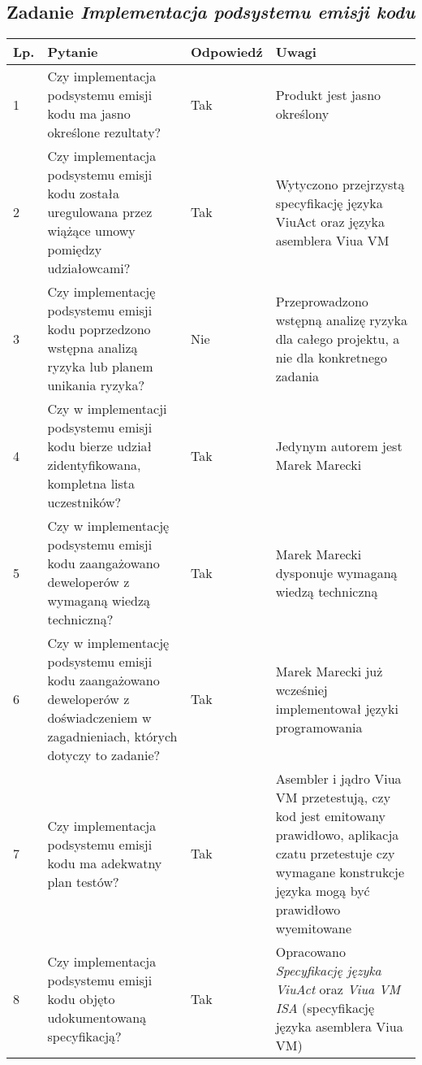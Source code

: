 \documentclass[11pt,oneside,a4paper,titlepage,onecolumn]{article}
\begin{document}
\subsection{Zadanie \textit{Implementacja podsystemu emisji kodu}}

\phantom{...}

\begin{tabularx}{\textwidth}{|l|X|l|X|}
	\hline

	\hline
    Lp. & Pytanie & Odpowiedź & Uwagi \\ \hline
    
    1 
    & Czy implementacja podsystemu emisji kodu ma jasno określone 
    rezultaty?
    & Tak
    & Produkt jest jasno określony
    \\\hline

    2
	& Czy implementacja podsystemu emisji kodu została uregulowana
	przez wiążące umowy pomiędzy udziałowcami?
	& Tak
	& Wytyczono przejrzystą specyfikację języka ViuAct oraz języka
	asemblera Viua VM
	\\\hline	
	
	3
	& Czy implementację podsystemu emisji kodu poprzedzono wstępna
	analizą	ryzyka lub planem unikania ryzyka?
	& Nie
	& Przeprowadzono wstępną analizę ryzyka dla całego projektu, a
	nie dla konkretnego zadania
	\\\hline
	
	4
	& Czy w implementacji podsystemu emisji kodu bierze udział 
	zidentyfikowana, kompletna lista uczestników?
	& Tak
	& Jedynym autorem jest Marek Marecki
	\\\hline

	5
	& Czy w implementację podsystemu emisji kodu zaangażowano
	deweloperów z wymaganą wiedzą techniczną?
	& Tak
	& Marek Marecki dysponuje wymaganą wiedzą techniczną
	\\\hline
	
	6
	& Czy w implementację podsystemu emisji kodu zaangażowano
	deweloperów z doświadczeniem w zagadnieniach, których dotyczy 
	to zadanie?
	& Tak
	& Marek Marecki już wcześniej implementował języki programowania
	\\\hline

	7
	& Czy implementacja podsystemu emisji kodu ma adekwatny plan
	testów?
	& Tak
	& Asembler i jądro Viua VM przetestują, czy kod jest emitowany
	prawidłowo, aplikacja czatu przetestuje czy wymagane konstrukcje
	języka mogą być prawidłowo wyemitowane
	\\\hline	
	
	8
	& Czy implementacja podsystemu emisji kodu objęto udokumentowaną
	specyfikacją?
	& Tak
	& Opracowano \textit{Specyfikację języka ViuAct} oraz 
	\textit{Viua VM ISA} (specyfikację języka asemblera Viua VM)
	\\\hline
\end{tabularx}
\end{document}
